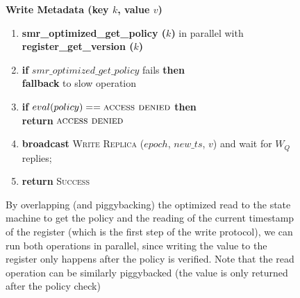\begin{figure}[t]
  \begin{small}
    \textbf{Write Metadata (key $k$, value $v$)}

    \begin{enumerate}[itemsep=0pt,parsep=0pt]

        \item \textbf{smr\_optimized\_get\_policy ($k$)} in
            parallel with \textbf{register\_get\_version ($k$)}

        \item \textbf{if} $smr\_optimized\_get\_policy$ fails \textbf{then}\\
            \tabto{.5cm}    \textbf{fallback} to slow operation

        \item \textbf{if} $eval(policy) == \textsc{access denied}$ \textbf{then}\\
            \tabto{.5cm}    \textbf{return} $\textsc{access denied}$

        \item \textbf{broadcast} \textsc{Write Replica} ($epoch$, $new\_ts$, $v$) and wait for $W_Q$ replies;

        \item \textbf{return} \textsc{Success}
    \end{enumerate}

  \end{small}
  \caption{By overlapping (and piggybacking) the optimized read
    to the state machine to get the policy and the reading of the
    current timestamp of the register (which is the first step of
    the write protocol), we can run both operations in parallel,
    since writing the value to the register only happens after
    the policy is verified. Note that the read operation can be
    similarly piggybacked (the value is only returned after the
    policy check)}\label{fig:teems_fast_mixing}
\end{figure}
